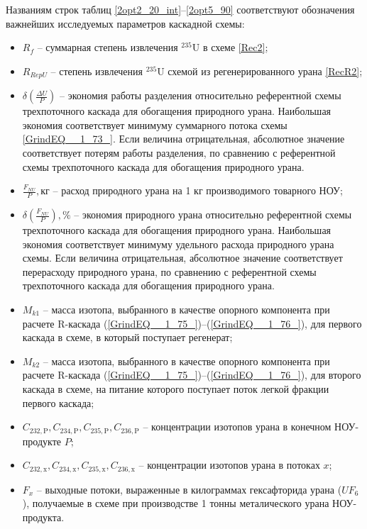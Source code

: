Названиям строк таблиц \ref{2opt2_20_int}--\ref{2opt5_90} соответствуют обозначения важнейших исследуемых параметров каскадной схемы:

\begin{itemize}
  \item $R_f$ -- суммарная степень извлечения $^{235}$U в схеме \ref{Rec2};
  \item $R_{RepU}$ -- степень извлечения $^{235}$U схемой из регенерированного урана \ref{RecR2};
  \item $\delta(\frac{\Delta U}{P})$ -- экономия работы разделения относительно референтной схемы трехпоточного каскада для обогащения природного урана. Наибольшая экономия соответствует минимуму суммарного потока схемы \ref{GrindEQ__1_73_}. Если величина отрицательная, абсолютное значение соответствует потерям работы разделения, по сравнению с референтной схемы трехпоточного каскада для обогащения природного урана.
  \item  $\frac{F_{NU}}{P}, \text{кг}$ -- расход природного урана на 1 кг производимого товарного НОУ;
  \item  $\delta(\frac{F_{NU}}{P}), \%$ -- экономия природного урана относительно референтной схемы трехпоточного каскада для обогащения природного урана.  Наибольшая экономия соответствует минимуму удельного расхода природного урана схемы. Если величина отрицательная, абсолютное значение соответствует перерасходу природного урана, по сравнению с референтной схемы трехпоточного каскада для обогащения природного урана.
  \item $M_{k1}$ -- масса изотопа, выбранного в качестве опорного компонента при расчете R-каскада (\ref{GrindEQ__1_75_})--(\ref{GrindEQ__1_76_}), для первого каскада в схеме, в который поступает регенерат;
  \item $M_{k2}$ -- масса изотопа, выбранного в качестве опорного компонента при расчете R-каскада (\ref{GrindEQ__1_75_})--(\ref{GrindEQ__1_76_}), для второго каскада в схеме, на питание которого поступает поток легкой фракции первого каскада;
  \item $C_{232,\text{P}},C_{234,\text{P}},C_{235,\text{P}},C_{236,\text{P}}$ -- концентрации изотопов урана в конечном НОУ-продукте $P$;
  \item $C_{232,\text{x}},C_{234,\text{x}},C_{235,\text{x}},C_{236,\text{x}}$ -- концентрации изотопов урана в потоках $x$;
  \item $F_{x}$ -- выходные потоки, выраженные в килограммах гексафторида урана ($UF_6$), получаемые в схеме при производстве 1 тонны металического урана НОУ-продукта.
\end{itemize}


